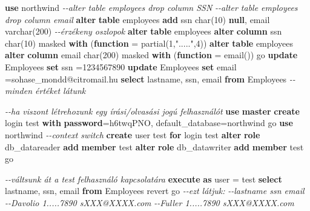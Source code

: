 \documentclass[
  magyar,
]{article}
\newenvironment{Shaded}{}{}
\newcommand{\CommentTok}[1]{\textcolor[rgb]{0.38,0.63,0.69}{\textit{#1}}}
\newcommand{\ControlFlowTok}[1]{\textcolor[rgb]{0.00,0.44,0.13}{\textbf{#1}}}
\newcommand{\DataTypeTok}[1]{\textcolor[rgb]{0.56,0.13,0.00}{#1}}
\newcommand{\DecValTok}[1]{\textcolor[rgb]{0.25,0.63,0.44}{#1}}
\newcommand{\FunctionTok}[1]{\textcolor[rgb]{0.02,0.16,0.49}{#1}}
\newcommand{\KeywordTok}[1]{\textcolor[rgb]{0.00,0.44,0.13}{\textbf{#1}}}
\newcommand{\NormalTok}[1]{#1}
\newcommand{\OperatorTok}[1]{\textcolor[rgb]{0.40,0.40,0.40}{#1}}
\newcommand{\StringTok}[1]{\textcolor[rgb]{0.25,0.44,0.63}{#1}}
\begin{document}
\begin{Shaded}
\begin{Highlighting}[]
\KeywordTok{use}\NormalTok{ northwind}
\CommentTok{{-}{-}alter table employees drop column SSN}
\CommentTok{{-}{-}alter table employees drop column email}
\KeywordTok{alter} \KeywordTok{table}\NormalTok{ employees }\KeywordTok{add}\NormalTok{ ssn }\DataTypeTok{char}\NormalTok{(}\DecValTok{10}\NormalTok{) }\KeywordTok{null}\NormalTok{, email }\DataTypeTok{varchar}\NormalTok{(}\DecValTok{200}\NormalTok{) }\CommentTok{{-}{-}érzékeny oszlopok}
\KeywordTok{alter} \KeywordTok{table}\NormalTok{ employees }\KeywordTok{alter} \KeywordTok{column}\NormalTok{ ssn }\DataTypeTok{char}\NormalTok{(}\DecValTok{10}\NormalTok{) masked }\KeywordTok{with}\NormalTok{ (}\KeywordTok{function} \OperatorTok{=}
\StringTok{\textquotesingle{}partial(1,".....",4)\textquotesingle{}}\NormalTok{)}
\KeywordTok{alter} \KeywordTok{table}\NormalTok{ employees }\KeywordTok{alter} \KeywordTok{column}\NormalTok{ email }\DataTypeTok{char}\NormalTok{(}\DecValTok{200}\NormalTok{) masked }\KeywordTok{with}\NormalTok{ (}\KeywordTok{function} \OperatorTok{=} \StringTok{\textquotesingle{}email()\textquotesingle{}}\NormalTok{)}
\NormalTok{go}
\KeywordTok{update}\NormalTok{ Employees }\KeywordTok{set}\NormalTok{ ssn }\OperatorTok{=}\StringTok{\textquotesingle{}1234567890\textquotesingle{}}
\KeywordTok{update}\NormalTok{ Employees }\KeywordTok{set}\NormalTok{ email }\OperatorTok{=}\StringTok{\textquotesingle{}sohase\_mondd@citromail.hu\textquotesingle{}}
\KeywordTok{select}\NormalTok{ lastname, ssn, email }\KeywordTok{from}\NormalTok{ Employees }\CommentTok{{-}{-}minden értéket látunk}

\CommentTok{{-}{-}ha viszont létrehozunk egy írási/olvasási jogú felhasználót}
\KeywordTok{use} \KeywordTok{master}
\KeywordTok{create}\NormalTok{ login test }\KeywordTok{with} \KeywordTok{password}\OperatorTok{=}\StringTok{\textquotesingle{}h6twqPNO\textquotesingle{}}\NormalTok{, default\_database}\OperatorTok{=}\NormalTok{northwind}
\NormalTok{go}
\KeywordTok{use}\NormalTok{ northwind }\CommentTok{{-}{-}context switch}
\KeywordTok{create} \FunctionTok{user}\NormalTok{ test }\ControlFlowTok{for}\NormalTok{ login test}
\KeywordTok{alter} \KeywordTok{role}\NormalTok{ db\_datareader }\KeywordTok{add} \KeywordTok{member}\NormalTok{ test}
\KeywordTok{alter} \KeywordTok{role}\NormalTok{ db\_datawriter }\KeywordTok{add} \KeywordTok{member}\NormalTok{ test}
\NormalTok{go}

\CommentTok{{-}{-}váltsunk át a test felhasználó kapcsolatára}
\KeywordTok{execute} \KeywordTok{as} \FunctionTok{user} \OperatorTok{=} \StringTok{\textquotesingle{}test\textquotesingle{}}
\KeywordTok{select}\NormalTok{ lastname, ssn, email }\KeywordTok{from}\NormalTok{ Employees}
\NormalTok{revert}
\NormalTok{go}
\CommentTok{{-}{-}ezt látjuk:}
\CommentTok{{-}{-}lastname     ssn           email}
\CommentTok{{-}{-}Davolio      1.....7890    sXXX@XXXX.com}
\CommentTok{{-}{-}Fuller       1.....7890    sXXX@XXXX.com}


\end{Highlighting}
\end{Shaded}
\end{document}

